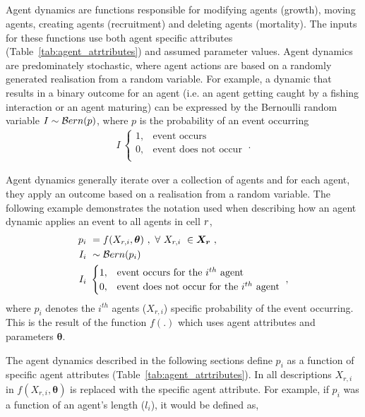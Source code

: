 \subsection{}\label{sec:process}
Agent dynamics are functions responsible for modifying agents (growth), moving agents, creating agents (recruitment) and deleting agents (mortality). The inputs for these functions use both agent specific attributes (Table~\ref{tab:agent_atrtributes}) and assumed parameter values. Agent dynamics are predominately stochastic, where agent actions are based on a randomly generated realisation from a random variable. For example, a dynamic that results in a binary outcome for an agent (i.e. an agent getting caught by a fishing interaction or an agent maturing) can be expressed by the Bernoulli random variable \(I\sim\mathcal{B}ern(p)\), where \(p\) is the probability of an event occurring
\begin{align*}\label{eg:bernoulli}
I \ 
\begin{cases}
1,& \text{event occurs} \\
0,& \text{event does not occur} \\	
\end{cases}  \ .
\end{align*}


Agent dynamics generally iterate over a collection of agents and for each agent, they apply an outcome based on a realisation from a random variable. The following example demonstrates the notation used when describing how an agent dynamic applies an event to all agents in cell \(r\),
\begin{align*}
p_i \ &= f(X_{r,i}, \bm{\theta}) \ , \ \forall \ X_{r,i} \ \in \bm{X_r} \ , \\
I_i \ &\sim\mathcal{B}ern(p_i)\\
I_i \ &
\begin{cases}
1,& \text{event occurs for the }i^{th}\text{ agent}\\
0,& \text{event does not occur for the }i^{th}\text{ agent}
\end{cases} \ ,
\end{align*} 
%
where \(p_i\) denotes the \(i^{th}\) agents (\(X_{r,i}\)) specific probability of the event occurring. This is the result of the function \(f(.)\) which uses agent attributes and parameters \(\bm{\theta}\). 

The agent dynamics described in the following sections define \(p_i\) as a function of specific agent attributes (Table~\ref{tab:agent_atrtributes}). In all descriptions \(X_{r,i}\) in \(f(X_{r,i}, \bm{\theta})\) is replaced with the specific agent attribute. For example, if \(p_i\) was a function of an agent's length (\(l_i\)), it would be defined as,

